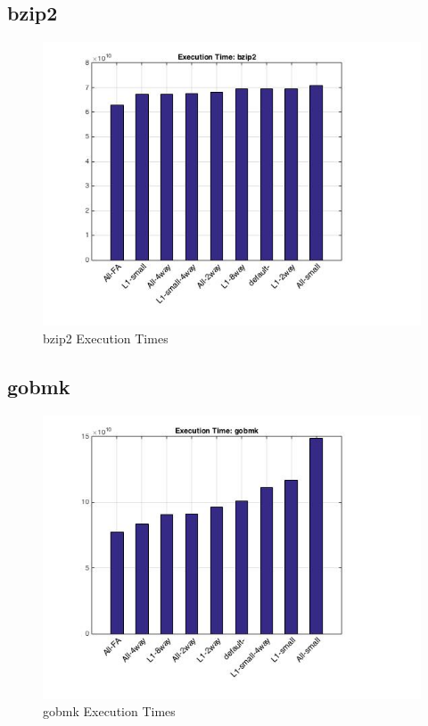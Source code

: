 \documentclass[11pt,titlepage]{article}
\begin{document}
    \subsection{bzip2}
	\begin{figure}[H]
            \centering
            \includegraphics[scale=0.75]{etbzip2}
            \caption{bzip2 Execution Times}
            \label{fig:etbzip2}
        \end{figure}

    \subsection{gobmk}
	\begin{figure}[H]
            \centering
            \includegraphics[scale=0.75]{etgobmk}
            \caption{gobmk Execution Times}
            \label{fig:etgobmk}
        \end{figure}
\end{document}
